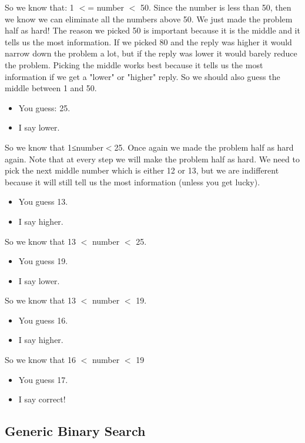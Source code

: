 \documentclass[11pt,oneside]{book}
\begin{document}
So we know that: 1 $<$= number $<$ 50. Since the number is less than 50, then we know we can eliminate all the numbers above 50. We just made the problem half as hard! The reason we picked 50 is important because it is the middle and it tells us the most information. If we picked 80 and the reply was higher it would narrow down the problem a lot, but if the reply was lower it would barely reduce the problem. Picking the middle works best because it tells us the most information if we get a "lower" or "higher" reply. So we should also guess the middle between 1 and 50.

\begin{itemize}
\item You guess: 25.
\item I say lower.
\end{itemize}

So we know that 1≤number$<$25. Once again we made the problem half as hard again. Note that at every step we will make the problem half as hard. We need to pick the next middle number which is either 12 or 13, but we are indifferent because it will still tell us the most information (unless you get lucky).

\begin{itemize}
\item You guess 13.
\item I say higher.
\end{itemize}

So we know that 13 $<$ number $<$ 25.

\begin{itemize}
\item You guess 19.
\item I say lower.
\end{itemize}

So we know that 13 $<$ number $<$ 19.

\begin{itemize}
\item You guess 16.
\item I say higher.
\end{itemize}

So we know that 16 $<$ number $<$ 19

\begin{itemize}
\item You guess 17.
\item I say correct!
\end{itemize}

\subsection{Generic Binary Search}
\end{document}
